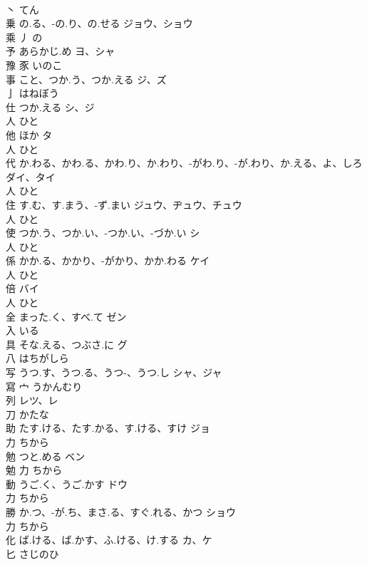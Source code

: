 \documentclass[8pt]{extreport}
\begin{document}
\begin{CJK}{UTF8}{min}
\\	丶		てん		
\\	乗	の.る、-の.り、の.せる	ジョウ、ショウ	
\\	乘	丿		の		
\\	予	あらかじ.め	ヨ、シャ	
\\	豫	豕		いのこ		
\\	事	こと、つか.う、つか.える	ジ、ズ	
\\	亅		はねぼう		
\\	仕	つか.える	シ、ジ	
\\	人		ひと		
\\	他	ほか	タ	
\\	人		ひと		
\\	代	か.わる、かわ.る、かわ.り、か.わり、-がわ.り、-が.わり、か.える、よ、しろ	ダイ、タイ	
\\	人		ひと		
\\	住	す.む、す.まう、-ず.まい	ジュウ、ヂュウ、チュウ	
\\	人		ひと		
\\	使	つか.う、つか.い、-つか.い、-づか.い	シ	
\\	人		ひと		
\\	係	かか.る、かかり、-がかり、かか.わる	ケイ	
\\	人		ひと		
\\	倍		バイ	
\\	人		ひと		
\\	全	まった.く、すべ.て	ゼン	
\\	入		いる		
\\	具	そな.える、つぶさ.に	グ	
\\	八		はちがしら		
\\	写	うつ.す、うつ.る、うつ-、うつ.し	シャ、ジャ	
\\	寫	宀		うかんむり		
\\	列		レツ、レ	
\\	刀		かたな		
\\	助	たす.ける、たす.かる、す.ける、すけ	ジョ	
\\	力		ちから		
\\	勉	つと.める	ベン	
\\	勉	力		ちから		
\\	動	うご.く、うご.かす	ドウ	
\\	力		ちから		
\\	勝	か.つ、-が.ち、まさ.る、すぐ.れる、かつ	ショウ	
\\	力		ちから		
\\	化	ば.ける、ば.かす、ふ.ける、け.する	カ、ケ	
\\	匕		さじのひ		

\end{CJK}
\end{document}
